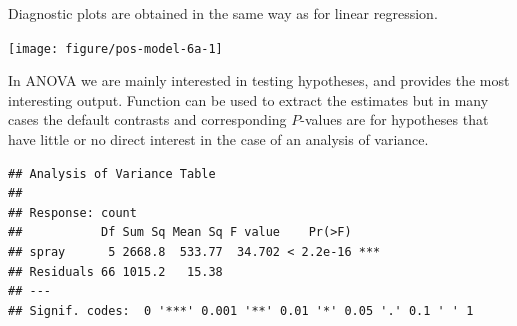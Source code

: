 \documentclass[krantz2]{krantz}\usepackage{knitr}%
\begin{document}
\begin{knitrout}\footnotesize
{}\color{fgcolor}\begin{kframe}
\begin{alltt}
 \hlkwb{<-}  \hlopt{~}   
\end{alltt}
\end{kframe}
\end{knitrout}

Diagnostic plots are obtained in the same way as for linear regression.

\begin{knitrout}\footnotesize
{}\color{fgcolor}\begin{kframe}
\begin{alltt}
  \hlstd{=} \hlstd{)}
\end{alltt}
\end{kframe}

{\centering \texttt{[image: figure/pos-model-6a-1]} 

}



\end{knitrout}

In ANOVA we are mainly interested in testing hypotheses, and  provides the most interesting output. Function  can be used to extract the estimates but in many cases the default contrasts and corresponding $P$-values are for hypotheses that have little or no direct interest in the case of an analysis of variance.

\begin{knitrout}\footnotesize
{}\color{fgcolor}\begin{kframe}
\begin{alltt}
\end{alltt}
\begin{verbatim}
## Analysis of Variance Table
## 
## Response: count
##           Df Sum Sq Mean Sq F value    Pr(>F)    
## spray      5 2668.8  533.77  34.702 < 2.2e-16 ***
## Residuals 66 1015.2   15.38                      
## ---
## Signif. codes:  0 '***' 0.001 '**' 0.01 '*' 0.05 '.' 0.1 ' ' 1
\end{verbatim}
\end{kframe}
\end{knitrout}
\end{document}
